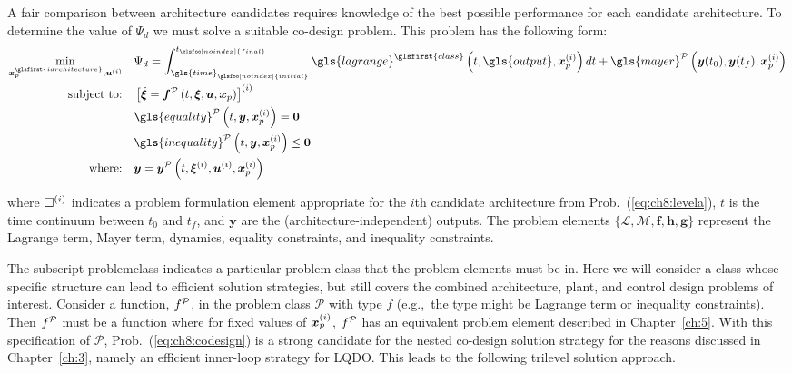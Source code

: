 A fair comparison between architecture candidates requires knowledge of the best possible performance for each candidate architecture.
To determine the value of $\Psi_d$ we must solve a suitable co-design problem.
This problem has the following form:
\begin{subequations}
\label{eq:ch8:codesign}
\begin{align}
\min_{\bm{x}_p^{\glsfirst{iarchitecture}}, \bm{u}\xarch} \quad & \Psi_d = \int_{\gls{time}_{\glsfoo[noindex]{initial}}}^{t_{\glsfoo[noindex]{final}}} \gls{lagrange}^{\glsfirst{class}}\left(t, \gls{output}, \bm{x}_p\xarch \right) dt + \gls{mayer}\xclass\left( \bm{y}(t_0), \bm{y}(t_f), \bm{x}_p\xarch \right) \\
\text{subject to:} \quad & \left[ \dot{\bm{\xi}} = \bm{f}\xclass\left( t, \bm{\xi}, \bm{u}, \bm{x}_p \right) \right]\xarch \\
& \gls{equality}\xclass\left(t, \bm{y}, \bm{x}_p\xarch \right) = \bm{0} \\
& \gls{inequality}\xclass\left(t, \bm{y}, \bm{x}_p\xarch \right) \leq \bm{0} \\
\text{where:} \quad & \bm{y} = \bm{y}\xclass\left( t, \bm{\xi}\xarch, \bm{u}\xarch, \bm{x}_p\xarch \right)
\end{align}
\end{subequations}

\noindent where $\Box^{(i)}$ indicates a problem formulation element appropriate for the $i$th candidate architecture from Prob.~(\ref{eq:ch8:levela}), $t$ is the time continuum between $t_0$ and $t_f$, and $\bm{y}$ are the (architecture-independent) outputs.
The problem elements $\{\mathcal{L}, \mathcal{M}, \bm{f}, \bm{h}, \bm{g} \}$ represent the Lagrange term, Mayer term, dynamics, equality constraints, and inequality constraints.

The subscript \gls{problemclass} indicates a particular problem class that the problem elements must be in.
Here we will consider a class whose specific structure can lead to efficient solution strategies, but still covers the combined architecture, plant, and control design problems of interest.
Consider a function, $f^{\mathcal{P}}$, in the problem class $\mathcal{P}$ with type $f$ (e.g.,~the type might be Lagrange term or inequality constraints).
Then $f^{\mathcal{P}}$ must be a function where for fixed values of $\bm{x}_p^{(i)}$, $f^{\mathcal{P}}$ has an equivalent  problem element described in Chapter~\ref{ch:5}.
With this specification of $\mathcal{P}$, Prob.~(\ref{eq:ch8:codesign}) is a strong candidate for the nested co-design solution strategy for the reasons discussed in Chapter~\ref{ch:3}, namely an efficient inner-loop strategy for LQDO.
This leads to the following trilevel solution approach.

